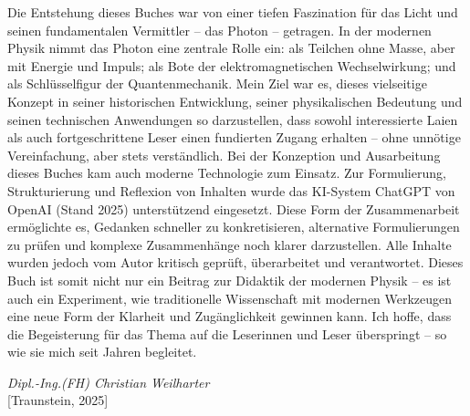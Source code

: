 Die Entstehung dieses Buches war von einer tiefen Faszination für das Licht und seinen fundamentalen Vermittler – das Photon – getragen. In der modernen Physik nimmt das Photon eine zentrale Rolle ein: als Teilchen ohne Masse, aber mit Energie und Impuls; als Bote der elektromagnetischen Wechselwirkung; und als Schlüsselfigur der Quantenmechanik.
	\noindent
Mein Ziel war es, dieses vielseitige Konzept in seiner historischen Entwicklung, seiner physikalischen Bedeutung und seinen technischen Anwendungen so darzustellen, dass sowohl interessierte Laien als auch fortgeschrittene Leser einen fundierten Zugang erhalten – ohne unnötige Vereinfachung, aber stets verständlich.
	\noindent
Bei der Konzeption und Ausarbeitung dieses Buches kam auch moderne Technologie zum Einsatz. Zur Formulierung, Strukturierung und Reflexion von Inhalten wurde das KI-System ChatGPT von OpenAI (Stand 2025) unterstützend eingesetzt. Diese Form der Zusammenarbeit ermöglichte es, Gedanken schneller zu konkretisieren, alternative Formulierungen zu prüfen und komplexe Zusammenhänge noch klarer darzustellen.
Alle Inhalte wurden jedoch vom Autor kritisch geprüft, überarbeitet und verantwortet.
	\noindent
Dieses Buch ist somit nicht nur ein Beitrag zur Didaktik der modernen Physik – es ist auch ein Experiment, wie traditionelle Wissenschaft mit modernen Werkzeugen eine neue Form der Klarheit und Zugänglichkeit gewinnen kann.
	\noindent
Ich hoffe, dass die Begeisterung für das Thema auf die Leserinnen und Leser überspringt – so wie sie mich seit Jahren begleitet.



\begin{flushright}
	\textit{Dipl.-Ing.(FH) Christian Weilharter} \\
	\vspace{0.5em}
	[Traunstein, 2025]
\end{flushright}


